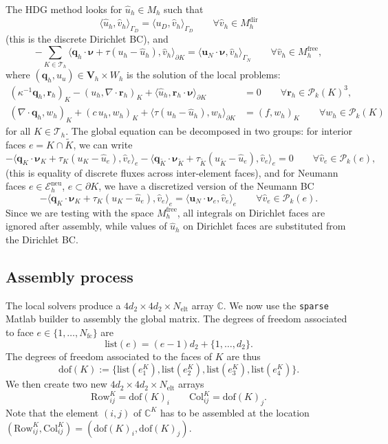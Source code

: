 \documentclass[10pt,english]{article}
\newcommand{\Nelt}{{N_{\mathrm{elt}}}}
\newcommand{\Nfc}{{N_{\mathrm{fc}}}}
\newcommand{\dir}{{\mathrm{dir}}}
\newcommand{\neu}{{\mathrm{neu}}}
\newcommand{\free}{{\mathrm{free}}}
\begin{document}
The HDG method looks for $\widehat u_h \in M_h$ such that
\[
\langle \widehat u_h,\widehat v_h\rangle_{\Gamma_D} = \langle u_D,\widehat v_h\rangle_{\Gamma_D} \qquad \forall \widehat v_h\in M_h^\dir
\]
(this is the discrete Dirichlet BC), and
\[
-\sum_{K\in \mathcal T_h} \langle \boldsymbol q_h\cdot\boldsymbol\nu+\tau(u_h-\widehat u_h),\widehat v_h\rangle_{\partial K} = \langle \boldsymbol u_N\cdot\boldsymbol\nu,\widehat v_h\rangle_{\Gamma_N} \qquad \forall \widehat v_h \in M_h^\free,
\]
where $(\boldsymbol q_h,u_u)\in \boldsymbol V_h \times W_h$ is the solution of the local problems:
\[
\begin{array}{rl} (\kappa^{-1} \boldsymbol q_h,\boldsymbol r_h)_K -(u_h,\nabla\cdot\boldsymbol r_h)_K +\langle \widehat u_h,\boldsymbol  r_h\cdot\boldsymbol\nu\rangle_{\partial K} &=0 \qquad \forall \boldsymbol r_h \in \mathcal P_k(K)^3,\\[1.5ex]
(\nabla\cdot\boldsymbol q_h,w_h)_K + (c \, u_h,w_h)_K +\langle \tau(u_h-\widehat u_h),w_h\rangle_{\partial K} &=(f,w_h)_K \qquad \forall w_h \in \mathcal P_k(K)
\end{array}
\]
for all $K \in \mathcal T_h$. The global equation can be decomposed in two groups: for interior faces $e=K\cap \tilde K$, we can write
\[
-\langle \boldsymbol q_K\cdot\boldsymbol\nu_K+\tau_K(u_K-\widehat u_e),\widehat v_e\rangle_e-\langle \boldsymbol q_{\tilde K}\cdot\boldsymbol\nu_{\tilde K}+\tau_{\tilde K} (u_{\tilde K}-\widehat u_e),\widehat v_e\rangle_e =0  \qquad \forall \widehat v_e \in \mathcal P_k(e),
\]
(this is equality of discrete fluxes across inter-element faces), and for Neumann faces $e\in \mathcal E_h^\neu$, $e\subset \partial K$, we have a discretized version of the Neumann BC
\[
-\langle \boldsymbol q_K\cdot\boldsymbol\nu_K+\tau_K(u_K-\widehat u_e),\widehat v_e\rangle_e=\langle \boldsymbol u_N\cdot\boldsymbol\nu_e,\widehat v_e\rangle_e  \qquad \forall \widehat v_e \in \mathcal P_k(e).
\]
Since we are testing with the space $M_h^\free$, all integrals on Dirichlet faces are ignored after assembly, while values of $\widehat u_h$ on Dirichlet faces are substituted from the Dirichlet BC.

\subsection{Assembly process}

The local solvers produce a $4d_2\times 4d_2\times \Nelt$ array $\mathbb C$. We now use the {\tt sparse} Matlab builder to assembly the global matrix. The degrees of freedom associated to face $e\in \{1,\ldots,\Nfc\}$ are
\[
\mathrm{list}(e)=(e-1)d_2+\{1,\ldots,d_2\}.
\]
The degrees of freedom associated to the faces of $K$ are thus
\[
\mathrm{dof}(K):=\{ \mathrm{list}(e_1^K),\mathrm{list}(e_2^K),\mathrm{list}(e_3^K),\mathrm{list}(e_4^K)\}.
\]
We then create two new $4d_2\times 4d_2\times \Nelt$ arrays
\[
\mathrm{Row}_{ij}^K = \mathrm{dof}(K)_i \qquad \mathrm{Col}_{ij}^K = \mathrm{dof}(K)_j.
\]
Note that the element $(i,j)$ of $\mathbb C^K$ has to be assembled at the location $(\mathrm{Row}^K_{ij},\mathrm{Col}^K_{ij})=
( \mathrm{dof}(K)_i ,  \mathrm{dof}(K)_j)$.  
\end{document}

